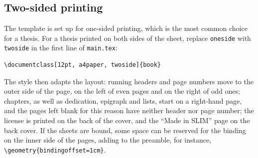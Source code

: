 \subsection{Two-sided printing} \label{sec:twoside}

The template is set up for one-sided printing, which is the most common
choice for a thesis. For a thesis printed on both sides of the sheet,
replace \texttt{oneside} with \texttt{twoside} in the first line of
\texttt{main.tex}:
\begin{Verbatim}
\documentclass[12pt, a4paper, twoside]{book}
\end{Verbatim}
The style then adapts the layout: running headers and page numbers move to
the outer side of the page, on the left of even pages and on the right of
odd ones; chapters, as well as dedication, epigraph and lists, start on a
right-hand page, and the pages left blank for this reason have neither
header nor page number; the license is printed on the back of the cover,
and the ``Made in SLIM'' page on the back cover. If the sheets are bound,
some space can be reserved for the binding on the inner side of the pages,
adding to the preamble, for instance, \verb|\geometry{bindingoffset=1cm}|.
